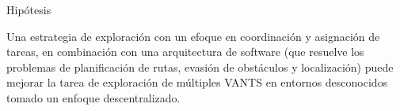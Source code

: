 \documentclass[
  24pt, %
  aspectratio=169, %
]{beamer}
\begin{document}
\begin{frame}{Hipótesis}

  Una estrategia de exploración con un efoque en coordinación y asignación de tareas, en combinación con una arquitectura de software (que resuelve los problemas de planificación de rutas, evasión de obstáculos y localización) puede mejorar la tarea de exploración de múltiples VANTS en entornos desconocidos tomado un enfoque descentralizado.
  
  
  
\end{frame}
\end{document}
